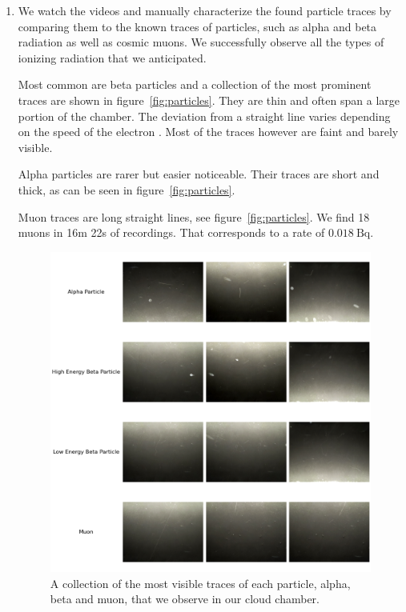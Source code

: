\documentclass[10pt,a4paper]{article}
\begin{document}
\begin{enumerate}
    \item We watch the videos and manually characterize the found particle traces by comparing them to the known traces of particles, such as alpha and beta radiation as well as  cosmic muons.
    We successfully observe all the types of ionizing radiation that we anticipated. 
    
    Most common are beta particles and a collection of the most prominent traces are shown in figure~\vref{fig:particles}. They are thin and often span a large portion of the chamber. The deviation from a straight line varies depending on the speed of the electron \cite{ParticlesInCloudChamber}. Most of the traces however are faint and barely visible. 
    
    Alpha particles are rarer but easier noticeable. Their traces are short and thick, as can be seen in figure~\vref{fig:particles}. 
    
    Muon traces are long straight lines, see figure~\vref{fig:particles}.  %
    We find 18 muons in 16m 22s of recordings. That corresponds to a rate of $\qty{0.018}{\becquerel}$.

    \begin{figure}
    \centering
    \includegraphics[width=1\linewidth]{images/particles.png}
    \caption{A collection of the most visible traces of each particle, alpha, beta and muon, that we observe in our cloud chamber.}
    \label{fig:particles}
    \end{figure}


\end{enumerate}
\end{document}
